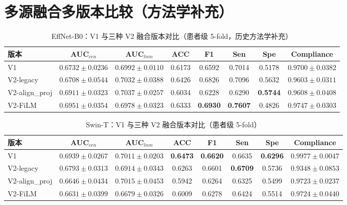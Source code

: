 \documentclass[12pt,a4paper]{ctexart}
\begin{document}
\section{多源融合多版本比较（方法学补充）}
\begin{table}[H]
\centering
\caption{EffNet-B0：V1 与三种 V2 融合版本对比（患者级 5-fold，历史方法学补充）}
\small
\begin{tabular}{lccccccc}
\toprule
版本 & AUC$_{cen}$ & AUC$_{lnm}$ & ACC & F1 & Sen & Spe & Compliance \\
\midrule
V1 & $0.6732\pm0.0236$ & $0.6992\pm0.0110$ & 0.6173 & 0.6592 & 0.7014 & 0.5178 & $0.9700\pm0.0382$ \\
V2-legacy & $0.6708\pm0.0544$ & $0.7032\pm0.0388$ & 0.6426 & 0.6826 & 0.7096 & 0.5632 & $0.9603\pm0.0311$ \\
V2-align\_proj & $0.6911\pm0.0323$ & $0.7037\pm0.0257$ & 0.6034 & 0.6228 & 0.6290 & \textbf{0.5744} & $0.9608\pm0.0408$ \\
V2-FiLM & $\mathbf{0.6951\pm0.0354}$ & $0.6978\pm0.0323$ & 0.6333 & \textbf{0.6930} & \textbf{0.7607} & 0.4826 & $\mathbf{0.9747\pm0.0303}$ \\
\bottomrule
\end{tabular}
\end{table}

\begin{table}[H]
\centering
\caption{Swin-T：V1 与三种 V2 融合版本对比（患者级 5-fold）}
\small
\begin{tabular}{lccccccc}
\toprule
版本 & AUC$_{cen}$ & AUC$_{lnm}$ & ACC & F1 & Sen & Spe & Compliance \\
\midrule
V1 & $\mathbf{0.6939\pm0.0267}$ & $\mathbf{0.7011\pm0.0203}$ & \textbf{0.6473} & \textbf{0.6620} & 0.6635 & \textbf{0.6296} & $\mathbf{0.9977\pm0.0047}$ \\
V2-legacy & $0.6793\pm0.0313$ & $0.6914\pm0.0343$ & 0.6263 & 0.6601 & \textbf{0.6709} & 0.5736 & $0.9348\pm0.0853$ \\
V2-align\_proj & $0.6646\pm0.0434$ & $\mathbf{0.7015\pm0.0453}$ & 0.5942 & 0.6264 & 0.6325 & 0.5499 & $0.9723\pm0.0237$ \\
V2-FiLM & $0.6631\pm0.0399$ & $0.6679\pm0.0326$ & 0.6009 & 0.6278 & 0.6424 & 0.5514 & $0.9724\pm0.0440$ \\
\bottomrule
\end{tabular}
\end{table}
\end{document}
